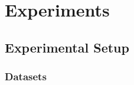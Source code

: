 \documentclass[3p,twocolumn,authoryear]{elsarticle}
\begin{document}
\section{Experiments}\label{sec:exp}

\subsection{Experimental Setup}\label{sec:exp:setup}

\subsubsection{Datasets}\label{sec:exp:setup:data}
\end{document}
